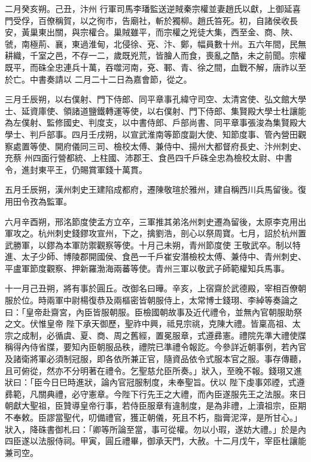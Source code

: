 \begin{pinyinscope}
 二月癸亥朔。己丑，汴州
 行軍司馬李璠監送逆賊秦宗權並妻趙氏以獻，上御延喜門受俘，百僚稱賀，以之徇市，告廟社，斬於獨柳。趙氏笞死。初，自諸侯收長安，黃巢東出關，與宗權合。巢賊雖平，而宗權之兇徒大集，西至金、商、陜、虢，南極荊、襄，東過淮甸，北侵徐、兗、汴、鄭，幅員數十州。五六年間，民無耕織，千室之邑，不存一二，歲既兇荒，皆膾人而食，喪亂之酷，未之前聞。宗權既平，而硃全忠連兵十萬，吞噬河南，兗、鄆、青、徐之間，血戰不解，唐祚以至於亡。中書奏請以
 二月二十二日為嘉會節，從之。



 三月壬辰朔，以右僕射、門下侍郎、同平章事孔緯守司空、太清宮使、弘文館大學士、延資庫使、領諸道鹽鐵轉運等使，以右僕射、門下侍郎、集賢殿大學士杜讓能為左僕射、監修國史、判度支，以中書侍郎、戶部尚書、同平章事張浚為集賢殿大學士、判戶部事。四月壬戌朔，以宣武淮南等節度副大使、知節度事、管內營田觀察處置等使、開府儀同三司、檢校太傅、兼侍中、揚州大都督府長史、汴州刺史、充蔡
 州四面行營都統、上柱國、沛郡王、食邑四千戶硃全忠為檢校太尉、中書令，進封東平王，仍賜賞軍錢十萬貫。



 五月壬辰朔，漢州刺史王建陷成都府，遷陳敬瑄於雅州，建自稱西川兵馬留後。復用田令孜為監軍。



 六月辛酉朔，邢洺節度使孟方立卒，三軍推其弟洺州刺史遷為留後，太原李克用出軍攻之。杭州刺史錢鏐攻宣州，下之，擒劉浩，剖心以祭周寶。七月，詔於杭州置武勝軍，以鏐為本軍防禦觀察等使。十月己未朔，青州節度使
 王敬武卒。制以特進、太子少師、博陵郡開國侯、食邑一千戶崔安潛檢校太傅、兼侍中、青州刺史、平盧軍節度觀察、押新羅渤海兩蕃等使。青州三軍以敬武子師範權知兵馬事。



 十一月己丑朔，將有事於圓丘。改御名曰曄。辛亥，上宿齋於武德殿，宰相百僚朝服於位。時兩軍中尉楊復恭及兩樞密皆朝服侍上，太常博士錢珝、李綽等奏論之曰：「皇帝赴齋宮，內臣皆服朝服。臣檢國朝故事及近代禮令，並無內官朝服助祭之文。伏惟皇帝
 陛下承天御歷，聖祚中興，祗見宗祧，克陳大禮。皆稟高祖、太宗之成制，必循虞、夏、商、周之舊經，置冕服章，式遵彞憲。禮院先準大禮使牒稱得內侍省牒，要知內臣朝服品秩，禮院已準禮令報訖。今參詳近朝事例，若內官及諸衛將軍必須制冠服，即各依所兼正官，隨資品依令式服本官之服。事存傳聽，且可俯從，然亦不分明著在禮令。乞聖慈允臣所奏。」狀入，至晚不報。錢珝又進狀曰：「臣今日巳時進狀，論內官冠服制度，未奉聖旨。伏以
 陛下虔事郊禋，式遵彞範，凡關典禮，必守憲章。今陛下行先王之大禮，而內臣遂服先王之法服。來日朝獻大聖祖，臣贊導皇帝行事，若侍臣服章有違制度，是為非禮，上瀆祖宗，臣期不奉敕。臣謬當聖代，叨備禮官，獲正朝儀，死且不朽，脂膏泥滓，是所甘心。」狀入，降硃書御札曰：「卿等所論至當，事可從權。勿以小瑕，遂妨大禮。」於是內四臣遂以法服侍祠。甲寅，圓丘禮畢，御承天門，大赦。十二月戊午，宰臣杜讓能兼司空。




\end{pinyinscope}
